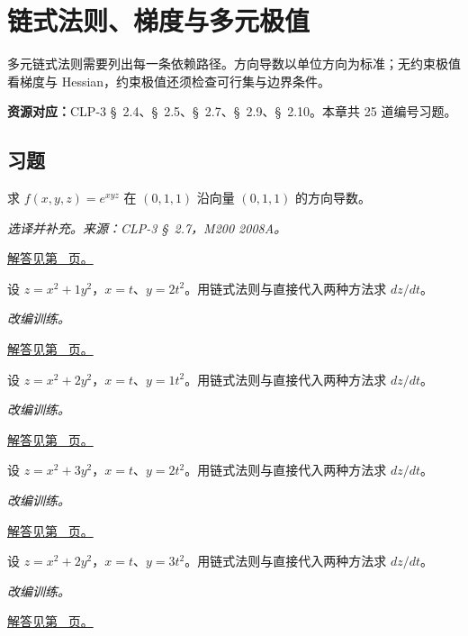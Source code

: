 \documentclass[UTF8,12pt,a4paper,fontset=fandol]{ctexart}
\begin{document}
\clearpage
\section{链式法则、梯度与多元极值}\label{sec:ch34}
多元链式法则需要列出每一条依赖路径。方向导数以单位方向为标准；无约束极值看梯度与 Hessian，约束极值还须检查可行集与边界条件。

\textbf{资源对应：}CLP-3 \S~2.4、\S~2.5、\S~2.7、\S~2.9、\S~2.10。本章共 25 道编号习题。
\subsection{习题}
\begin{example}[方向向量必须单位化]\label{ex:c34q1}
求 $f(x,y,z)=e^{xyz}$ 在 $(0,1,1)$ 沿向量 $(0,1,1)$ 的方向导数。
\par\textit{选译并补充。来源：CLP-3 \S~2.7，M200 2008A。}\par\hyperref[ans:c34q1]{解答见第~\pageref{ans:c34q1} 页。}
\end{example}
\begin{example}[复合函数的两种求导路径]\label{ex:c34q2}
设 $z=x^2+1y^2$，$x=t$、$y=2t^2$。用链式法则与直接代入两种方法求 $dz/dt$。
\par\textit{改编训练。}\par\hyperref[ans:c34q2]{解答见第~\pageref{ans:c34q2} 页。}
\end{example}
\begin{example}[复合函数的两种求导路径]\label{ex:c34q3}
设 $z=x^2+2y^2$，$x=t$、$y=1t^2$。用链式法则与直接代入两种方法求 $dz/dt$。
\par\textit{改编训练。}\par\hyperref[ans:c34q3]{解答见第~\pageref{ans:c34q3} 页。}
\end{example}
\begin{example}[复合函数的两种求导路径]\label{ex:c34q4}
设 $z=x^2+3y^2$，$x=t$、$y=2t^2$。用链式法则与直接代入两种方法求 $dz/dt$。
\par\textit{改编训练。}\par\hyperref[ans:c34q4]{解答见第~\pageref{ans:c34q4} 页。}
\end{example}
\begin{example}[复合函数的两种求导路径]\label{ex:c34q5}
设 $z=x^2+2y^2$，$x=t$、$y=3t^2$。用链式法则与直接代入两种方法求 $dz/dt$。
\par\textit{改编训练。}\par\hyperref[ans:c34q5]{解答见第~\pageref{ans:c34q5} 页。}
\end{example}
\end{document}

